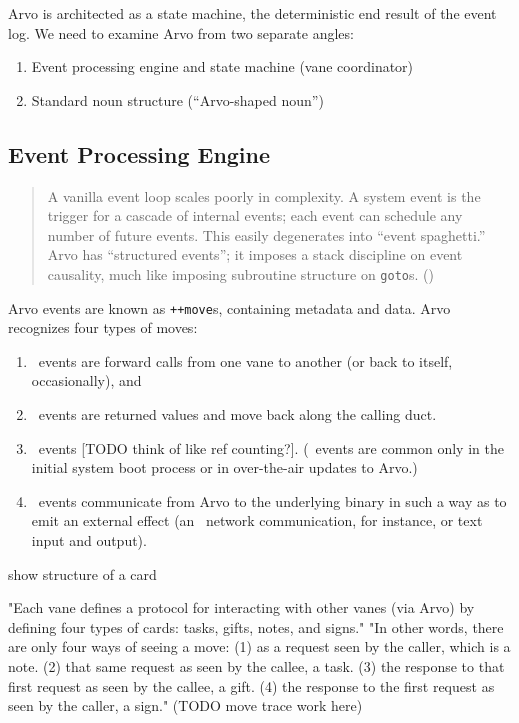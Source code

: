 Arvo is architected as a state machine, the deterministic end result of the event log.  We need to examine Arvo from two separate angles:

\begin{enumerate}
  \item  Event processing engine and state machine (vane coordinator)
  \item  Standard noun structure (“Arvo-shaped noun”)
\end{enumerate}

\subsection{Event Processing Engine}

\begin{quote}
A vanilla event loop scales poorly in complexity.  A system event is the trigger for a cascade of internal events; each event can schedule any number of future events.  This easily degenerates into “event spaghetti.”  Arvo has “structured events”; it imposes a stack discipline on event causality, much like imposing subroutine structure on \texttt{goto}s.  (\cite{Yarvin2017})
\end{quote}

Arvo events are known as \texttt{++move}s, containing metadata and data.  Arvo recognizes four types of moves:

\begin{enumerate}
  \item  \pass~events are forward calls from one vane to another (or back to itself, occasionally), and
  \item  \give~events are returned values and move back along the calling duct.
  \item  \slip~events [TODO think of like ref counting?].  (\slip~events are common only in the initial system boot process or in over-the-air updates to Arvo.)
  \item  \unix~events communicate from Arvo to the underlying binary in such a way as to emit an external effect (an \ames~network communication, for instance, or text input and output).
\end{enumerate}

show structure of a card

"Each vane defines a protocol for interacting with other vanes (via Arvo) by defining four types of cards: tasks, gifts, notes, and signs."
"In other words, there are only four ways of seeing a move: (1) as a request seen by the caller, which is a note. (2) that same request as seen by the callee, a task. (3) the response to that first request as seen by the callee, a gift. (4) the response to the first request as seen by the caller, a sign."
(TODO move trace work here)

